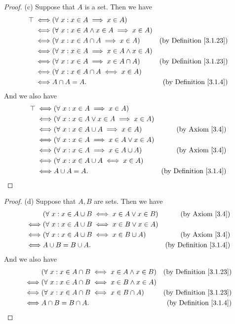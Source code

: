 \begin{proof}{(c)}
Suppose that \(A\) is a set.
Then we have
\begin{align*}
\top \iff & (\forall\ x : x \in A \implies x \in A) \\
\iff & (\forall\ x : x \in A \land x \in A \implies x \in A) \\
\iff & (\forall\ x : x \in A \cap A \implies x \in A) & \text{(by Definition \ref{3.1.23})} \\
\iff & (\forall\ x : x \in A \implies x \in A \land x \in A) \\
\iff & (\forall\ x : x \in A \implies x \in A \cap A) & \text{(by Definition \ref{3.1.23})} \\
\iff & (\forall\ x : x \in A \cap A \iff x \in A) \\
\iff & A \cap A = A. & \text{(by Definition \ref{3.1.4})}
\end{align*}
And we also have
\begin{align*}
\top \iff & (\forall\ x : x \in A \implies x \in A) \\
\iff & (\forall\ x : x \in A \lor x \in A \implies x \in A) \\
\iff & (\forall\ x : x \in A \cup A \implies x \in A) & \text{(by Axiom \ref{3.4})} \\
\iff & (\forall\ x : x \in A \implies x \in A \lor x \in A) \\
\iff & (\forall\ x : x \in A \implies x \in A \cup A) & \text{(by Axiom \ref{3.4})} \\
\iff & (\forall\ x : x \in A \cup A \iff x \in A) \\
\iff & A \cup A = A. & \text{(by Definition \ref{3.1.4})}
\end{align*}
\end{proof}

\begin{proof}{(d)}
Suppose that \(A, B\) are sets.
Then we have
\begin{align*}
& (\forall\ x : x \in A \cup B \iff x \in A \lor x \in B) & \text{(by Axiom \ref{3.4})} \\
\iff & (\forall\ x : x \in A \cup B \iff x \in B \lor x \in A) \\
\iff & (\forall\ x : x \in A \cup B \iff x \in B \cup A) & \text{(by Axiom \ref{3.4})} \\
\iff & A \cup B = B \cup A. & \text{(by Definition \ref{3.1.4})}
\end{align*}
And we also have
\begin{align*}
& (\forall\ x : x \in A \cap B \iff x \in A \land x \in B) & \text{(by Definition \ref{3.1.23})} \\
\iff & (\forall\ x : x \in A \cap B \iff x \in B \land x \in A) \\
\iff & (\forall\ x : x \in A \cap B \iff x \in B \cap A) & \text{(by Definition \ref{3.1.23})} \\
\iff & A \cap B = B \cap A. & \text{(by Definition \ref{3.1.4})}
\end{align*}
\end{proof}


